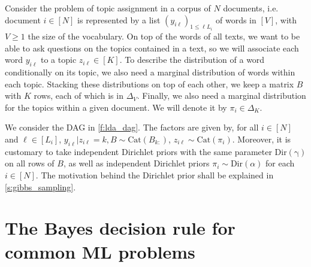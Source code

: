 \begin{example}
    \label{ex:lda}
    Consider the problem of topic assignment in a corpus of $N$ documents, i.e. document $i\in [N]$ is represented by a list $(y_{i\ell})_{1\leq \ell L_i}$ of words in $[V]$, with $V\geq 1$ the size of the vocabulary. 
    On top of the words of all texts, we want to be able to ask questions on the topics contained in a text, so we will associate each word $y_{i\ell}$ to a topic $z_{i\ell}\in [K]$. 
    To describe the distribution of a word conditionally on its topic, we also need a marginal distribution of words within each topic. 
    Stacking these distributions on top of each other, we keep a matrix $B$ with $K$ rows, each of which is in $\Delta_V$. 
    Finally, we also need a marginal distribution for the topics within a given document. 
    We will denote it by $\pi_i\in\Delta_K$.

    We consider the DAG in \cref{f:lda_dag}. 
    The factors are given by, for all $i\in[N]$ and $\ell\in[L_i]$, $y_{i\ell}\vert z_{i\ell}=k, B \sim \mathrm{Cat}(B_{k:})$, $z_{i\ell}\sim \mathrm{Cat}(\pi_i)$. 
    Moreover, it is customary to take independent Dirichlet priors with the same parameter $\mathrm{Dir(\gamma)}$ on all rows of $B$, as well as independent Dirichlet priors $\pi_i\sim \mathrm{Dir}(\alpha)$ for each $i\in[N]$. 
    The motivation behind the Dirichlet prior shall be explained in \cref{s:gibbs_sampling}.
\end{example}

\section{The Bayes decision rule for common ML problems}